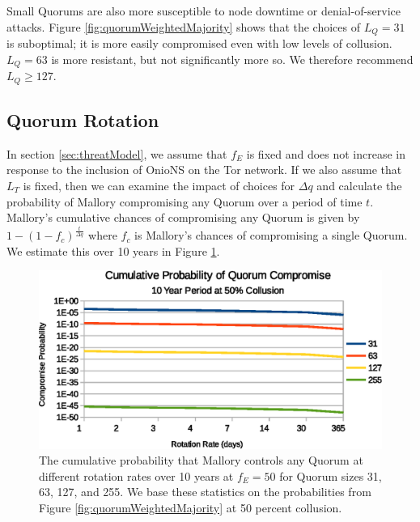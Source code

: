 \documentclass[USenglish,oneside,twocolumn]{article}
\begin{document}
Small Quorums are also more susceptible to node downtime or denial-of-service attacks. Figure \ref{fig:quorumWeightedMajority} shows that the choices of $ L_{Q} = 31 $ is suboptimal; it is more easily compromised even with low levels of collusion. $ L_{Q} = 63 $ is more resistant, but not significantly more so. We therefore recommend $ L_{Q} \geq 127 $.

\subsection{Quorum Rotation} %
\label{sec:qRotation}

In section \ref{sec:threatModel}, we assume that $ f_{E} $ is fixed and does not increase in response to the inclusion of OnioNS on the Tor network. If we also assume that $ L_{T} $ is fixed, then we can examine the impact of choices for $ \Delta q $ and calculate the probability of Mallory compromising any Quorum over a period of time $ t $. Mallory's cumulative chances of compromising any Quorum is given by $ 1 - (1 - f_{c})^{\frac{t}{\Delta q}} $ where $ f_{c} $ is Mallory's chances of compromising a single Quorum. We estimate this over 10 years in Figure \ref{fig:cumulativeProbability}.

\begin{figure}[h]
	\centering
	\includegraphics[width=\linewidth]{../assets/analysis/CumulativeMaliciousQuorumNew.eps}
	\caption{The cumulative probability that Mallory controls any Quorum at different rotation rates over 10 years at $ f_{E} = 50 $ for Quorum sizes 31, 63, 127, and 255. We base these statistics on the probabilities from Figure \ref{fig:quorumWeightedMajority} at 50 percent collusion.}
	\label{fig:cumulativeProbability}
\end{figure}
\end{document}
